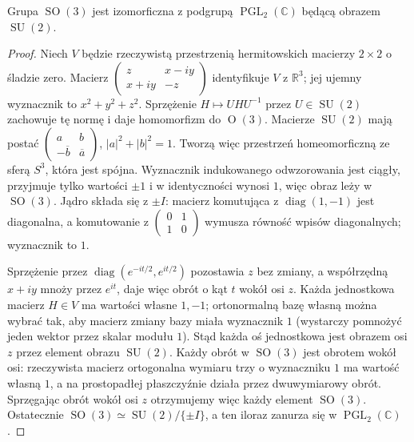 \begin{lemat}
\label{aa:lem:pgl2-rotations}
Grupa $\operatorname{SO}(3)$ jest izomorficzna z podgrupą
$\operatorname{PGL}_2(\mathbb C)$ będącą obrazem
$\operatorname{SU}(2)$.
\end{lemat}
\begin{proof}
Niech $V$ będzie rzeczywistą przestrzenią hermitowskich
macierzy $2\times2$ o śladzie zero.
Macierz
$\left(\begin{smallmatrix}z&x-iy\\x+iy&-z\end{smallmatrix}\right)$
identyfikuje $V$ z $\mathbb R^3$;
jej ujemny wyznacznik to $x^2+y^2+z^2$.
Sprzężenie $H\mapsto UHU^{-1}$ przez $U\in\operatorname{SU}(2)$
zachowuje tę normę i daje homomorfizm do $\operatorname O(3)$.
Macierze $\operatorname{SU}(2)$ mają postać
$\left(\begin{smallmatrix}a&b\\-\overline b&\overline a\end{smallmatrix}\right)$,
$|a|^2+|b|^2=1$. Tworzą więc przestrzeń homeomorficzną
ze sferą $S^3$, która jest spójna.
Wyznacznik indukowanego odwzorowania jest ciągły,
przyjmuje tylko wartości $\pm1$ i w identyczności wynosi $1$,
więc obraz leży w $\operatorname{SO}(3)$.
Jądro składa się z $\pm I$: macierz komutująca z
$\operatorname{diag}(1,-1)$ jest diagonalna, a komutowanie
z $\left(\begin{smallmatrix}0&1\\1&0\end{smallmatrix}\right)$
wymusza równość wpisów diagonalnych; wyznacznik to $1$.

Sprzężenie przez $\operatorname{diag}(e^{-it/2},e^{it/2})$
pozostawia $z$ bez zmiany, a współrzędną $x+iy$
mnoży przez $e^{it}$, daje więc obrót o kąt $t$
wokół osi $z$.
Każda jednostkowa macierz $H\in V$ ma wartości własne
$1,-1$; ortonormalną bazę własną można wybrać tak,
aby macierz zmiany bazy miała wyznacznik $1$ (wystarczy
pomnożyć jeden wektor przez skalar modułu $1$).
Stąd każda oś jednostkowa jest obrazem osi $z$
przez element obrazu $\operatorname{SU}(2)$.
Każdy obrót w $\operatorname{SO}(3)$ jest obrotem wokół osi:
rzeczywista macierz ortogonalna wymiaru trzy o wyznaczniku $1$
ma wartość własną $1$, a na prostopadłej płaszczyźnie
działa przez dwuwymiarowy obrót.
Sprzęgając obrót wokół osi $z$ otrzymujemy więc każdy
element $\operatorname{SO}(3)$. Ostatecznie
$\operatorname{SO}(3)\simeq\operatorname{SU}(2)/\{\pm I\}$,
a ten iloraz zanurza się w $\operatorname{PGL}_2(\mathbb C)$.
\end{proof}

